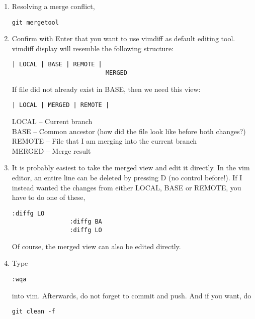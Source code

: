 \documentclass[12pt, a4paper]{scrbook}
\numberwithin{equation}{section}
\theoremstyle{definition}
\theoremstyle{definition}
\begin{document}
		\begin{enumerate}
			\item Resolving a merge conflict,
			
			\begin{lstlisting}[style=mystylebash, label=alg:mergetool, xleftmargin=\parindent]
				git mergetool
			\end{lstlisting}
		
			\item Confirm with Enter that you want to use vimdiff as default editing tool. vimdiff display will resemble the following structure: 
			
			\begin{lstlisting}[style=mystylebash, xleftmargin=\parindent]
				| LOCAL | BASE | REMOTE | 
				          MERGED
			\end{lstlisting}
			
			If file did not already exist in BASE, then we need this view: 
			
			\begin{lstlisting}[style=mystylebash, xleftmargin=\parindent]	
				| LOCAL | MERGED | REMOTE |
			\end{lstlisting}
			
			\noindent LOCAL  -- Current branch
			\\ BASE   -- Common ancestor (how did the file look like before both changes?)
			\\ REMOTE -- File that I am merging into the current branch
			\\ MERGED -- Merge result
			
			\item It is probably easiest to take the merged view and edit it directly. In the vim editor, an entire line can be deleted by pressing D (no control before!). 
			If I instead wanted the changes from either LOCAL, BASE or REMOTE, you have to do one of these,
			
			\begin{lstlisting}[style=mystylebash, label=git_merge_view__actions, xleftmargin=\parindent]
				:diffg LO
				:diffg BA
				:diffg LO
			\end{lstlisting}
			
			Of course, the merged view can also be edited directly.			

			\item Type
			
			\begin{lstlisting}[style=mystylebash, xleftmargin=\parindent]
				:wqa
			\end{lstlisting}
			
			into vim. Afterwards, do not forget to commit and push. And if you want, do 
			
			\begin{lstlisting}[style=mystylebash, label=alg:git_clean, xleftmargin=\parindent]
				git clean -f
			\end{lstlisting}
		
		\end{enumerate}
\end{document}
